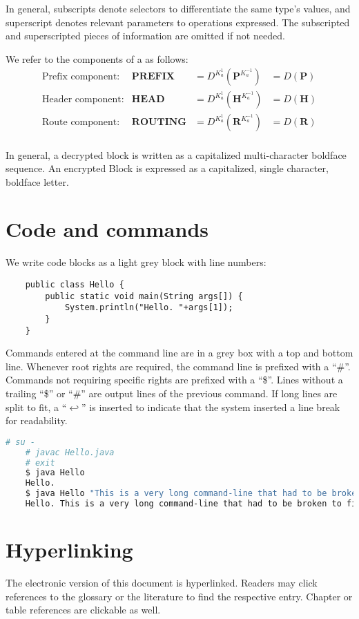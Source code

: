 In general, subscripts denote selectors to differentiate the same type's values, and superscript denotes relevant parameters to operations expressed. The subscripted and superscripted pieces of information are omitted if not needed.

We refer to the components of a \VortexMessage{} as follows:
\begin{align*}
	\text{Prefix component:}         & \mathbf{PREFIX}                 &=D^{K^{1}_a}\left(\mathbf{P}^{K^{-1}_a}\right) &=D\left(\mathbf{P}\right)\\
	\text{Header component:}         & \mathbf{HEAD}                   &=D^{K^{1}_a}\left(\mathbf{H}^{K^{-1}_a}\right) &=D\left(\mathbf{H}\right)\\
	\text{Route component:}         & \mathbf{ROUTING}                 &=D^{K^{1}_a}\left(\mathbf{R}^{K^{-1}_a}\right) &=D\left(\mathbf{R}\right)\\
\end{align*}

In general, a decrypted block is written as a capitalized multi-character boldface sequence. An encrypted Block is expressed as a capitalized, single character, boldface letter.

\section{Code and commands}
We write code blocks as a light grey block with line numbers:

\begin{lstlisting}
	public class Hello {
		public static void main(String args[]) {
			System.println("Hello. "+args[1]);
		}
	}
\end{lstlisting}

Commands entered at the command line are in a grey box with a top and bottom line. Whenever root rights are required, the command line is prefixed with a ``\#''. Commands not requiring specific rights are prefixed with a ``\$''. Lines without a trailing ``\$'' or ``\#'' are output lines of the previous command. If long lines are split to fit, a ``$\hookleftarrow$'' is inserted to indicate that the system inserted a line break for readability.

\begin{lstlisting}[language=bash]
	# su -
	# javac Hello.java 
	# exit
	$ java Hello
	Hello.
	$ java Hello "This is a very long command-line that had to be broken to fit into the code box displayed on this page."
	Hello. This is a very long command-line that had to be broken to fit into the code box displayed on this page.
\end{lstlisting}

\section{Hyperlinking}
The electronic version of this document is hyperlinked. Readers may click references to the glossary or the literature to find the respective entry. Chapter or table references are clickable as well. 


